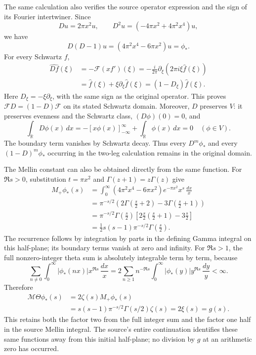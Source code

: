\documentclass[10pt,a4paper,oneside]{report}
\begin{document}
The same calculation also verifies the source operator expression and
the sign of its Fourier intertwiner. Since
\[
Du=2\pi x^2u,\qquad
D^2u=(-4\pi x^2+4\pi^2x^4)u,
\]
we have
\[
D(D-1)u=(4\pi^2x^4-6\pi x^2)u=\phi_*.
\]
For every Schwartz \(f\),
\[
\begin{aligned}
\widehat{Df}(\xi)
 &=-\mathcal F(xf')(\xi)
 =-\frac{i}{2\pi}\partial_\xi(2\pi i\xi\widehat f(\xi))\\
 &=\widehat f(\xi)+\xi\partial_\xi\widehat f(\xi)
 =(1-D_\xi)\widehat f(\xi).
\end{aligned}
\]
Here \(D_\xi=-\xi\partial_\xi\), with the same sign as the original
operator. This proves \(\mathcal F D=(1-D)\mathcal F\) on its stated
Schwartz domain. Moreover, \(D\) preserves \(V\): it preserves evenness
and the Schwartz class, \((D\phi)(0)=0\), and
\[
\int_{\mathbb R}D\phi(x)\,dx
=-[x\phi(x)]_{-\infty}^{\infty}
 +\int_{\mathbb R}\phi(x)\,dx=0
\quad(\phi\in V).
\]
The boundary term vanishes by Schwartz decay. Thus every
\(D^m\phi_*\) and every \((1-D)^m\phi_*\) occurring in the two-leg
calculation remains in the original domain.

The Mellin constant can also be obtained directly from the same
function. For \(\Re s>0\), substitution \(t=\pi x^2\) and
\(\Gamma(z+1)=z\Gamma(z)\) give
\[
\begin{aligned}
M_+\phi_*(s)
&=\int_0^\infty
 (4\pi^2x^4-6\pi x^2)e^{-\pi x^2}x^s\,\frac{dx}{x}\\
&=\pi^{-s/2}
 \left(2\Gamma\left(\frac s2+2\right)
       -3\Gamma\left(\frac s2+1\right)\right)\\
&=\pi^{-s/2}\Gamma\left(\frac s2\right)
 \left[2\frac s2\left(\frac s2+1\right)-3\frac s2\right]\\
&=\frac12s(s-1)\pi^{-s/2}\Gamma\left(\frac s2\right).
\end{aligned}
\]
The recurrence follows by integration by parts in the defining
Gamma integral on this half-plane; its boundary terms vanish
at zero and infinity. For \(\Re s>1\), the full nonzero-integer
theta sum is absolutely integrable term by term, because
\[
\sum_{n\ne0}\int_0^\infty
 |\phi_*(nx)|x^{\Re s}\,\frac{dx}{x}
=2\sum_{n\ge1}n^{-\Re s}
 \int_0^\infty|\phi_*(y)|y^{\Re s}\,\frac{dy}{y}<\infty.
\]
Therefore
\[
\begin{aligned}
\mathcal M\Theta\phi_*(s)
&=2\zeta(s)M_+\phi_*(s)\\
&=s(s-1)\pi^{-s/2}\Gamma(s/2)\zeta(s)
 =2\xi(s)=g(s).
\end{aligned}
\]
This retains both the factor two from the full integer sum and the
factor one half in the source Mellin integral. The source's entire
continuation identifies these same functions away from this initial
half-plane; no division by \(g\) at an arithmetic zero has occurred.
\end{document}
